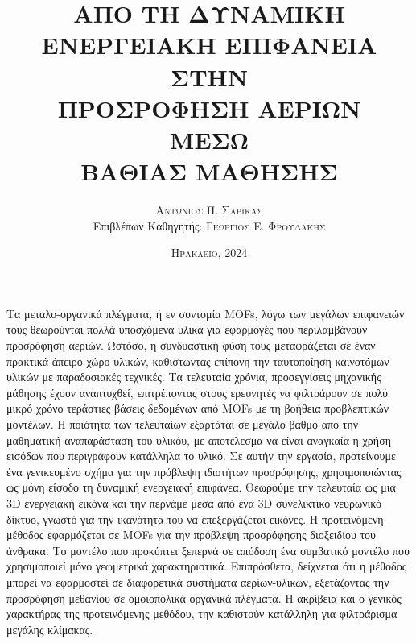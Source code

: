 \documentclass{article}
\title{
	\color{Blue}\Large\bfseries
	ΑΠΟ ΤΗ ΔΥΝΑΜΙΚΗ ΕΝΕΡΓΕΙΑΚΗ ΕΠΙΦΑΝΕΙΑ
	\\[0.2cm]
	\large ΣΤΗΝ
	\\[0.1cm]
	\Large ΠΡΟΣΡΟΦΗΣΗ ΑΕΡΙΩΝ
	\\[0.2cm]
	\large ΜΕΣΩ
	\\[0.1cm]
	\Large ΒΑΘΙΑΣ ΜΑΘΗΣΗΣ
	\vspace{1.5cm}
}
\author{
	{\scshape\Large Αντωνιος Π. Σαρικας}
	\\[0.5cm]
	Επιβλέπων Καθηγητής: \scshape{Γεωργιος Ε. Φρουδακης}
}
\date{\scshape Ηρακλειο, 2024\vspace{1cm}}
\newcommand{\MOFs}{\foreignlanguage{english}{MOFs}}
\newcommand{\threed}{\foreignlanguage{english}{3D}}
\begin{document}
\maketitle
{}

Τα μεταλο-οργανικά πλέγματα, ή εν συντομία \MOFs{}, λόγω των μεγάλων επιφανειών
τους θεωρούνται πολλά υποσχόμενα υλικά για εφαρμογές που περιλαμβάνουν
προσρόφηση αεριών. Ωστόσο, η συνδυαστική φύση τους μεταφράζεται σε έναν πρακτικά
άπειρο χώρο υλικών, καθιστώντας επίπονη την ταυτοποίηση καινοτόμων υλικών με
παραδοσιακές τεχνικές. Τα τελευταία χρόνια, προσεγγίσεις μηχανικής μάθησης έχουν
αναπτυχθεί, επιτρέποντας στους ερευνητές να φιλτράρουν σε πολύ μικρό χρόνο
τεράστιες βάσεις δεδομένων από \MOFs{} με τη βοήθεια προβλεπτικών μοντέλων. Η
ποιότητα των τελευταίων εξαρτάται σε μεγάλο βαθμό από την μαθηματική
αναπαράσταση του υλικόυ, με αποτέλεσμα να είναι αναγκαία η χρήση εισόδων που
περιγράφουν κατάλληλα το υλικό. Σε αυτήν την εργασία, προτείνουμε ένα
γενικευμένο σχήμα για την πρόβλεψη ιδιοτήτων προσρόφησης, χρησιμοποιώντας ως
μόνη είσοδο τη δυναμική ενεργειακή επιφάνεα. Θεωρούμε την τελευταία ως μια
\threed{} ενεργειακή εικόνα και την περνάμε μέσα από ένα \threed{} συνελικτικό
νευρωνικό δίκτυο, γνωστό για την ικανότητα του να επεξεργάζεται εικόνες. Η
προτεινόμενη μέθοδος εφαρμόζεται σε \MOFs{} για την πρόβλεψη προσρόφησης
διοξειδίου του άνθρακα. Το μοντέλο που προκύπτει ξεπερνά σε απόδοση ένα
συμβατικό μοντέλο που χρησιμοποιεί μόνο γεωμετρικά χαρακτηριστικά. Επιπρόσθετα,
δείχνεται ότι η μέθοδος μπορεί να εφαρμοστεί σε διαφορετικά συστήματα
αερίων-υλικών, εξετάζοντας την προσρόφηση μεθανίου σε ομοιοπολικά οργανικά
πλέγματα. Η ακρίβεια και ο γενικός χαρακτήρας της προτεινόμενης μεθόδου, την
καθιστούν κατάλληλη για φιλτράρισμα μεγάλης κλίμακας.
\end{document}
